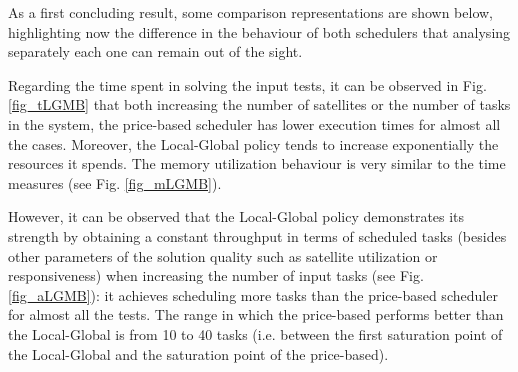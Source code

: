 As a first concluding result, some comparison representations are shown below, highlighting now the difference in the behaviour of both schedulers that analysing separately each one can remain out of the sight.

Regarding the time spent in solving the input tests, it can be observed in Fig. \ref{fig_tLGMB} that both increasing the number of satellites or the number of tasks in the system, the price-based scheduler has lower execution times for almost all the cases. Moreover, the Local-Global policy tends to increase exponentially the resources it spends. The memory utilization behaviour is very similar to the time measures (see Fig. \ref{fig_mLGMB}).

However, it can be observed that the Local-Global policy demonstrates its strength by obtaining a constant throughput in terms of scheduled tasks (besides other parameters of the solution quality such as satellite utilization or responsiveness) when increasing the number of input tasks (see Fig. \ref{fig_aLGMB}): it achieves scheduling more tasks than the price-based scheduler for almost all the tests. The range in which the price-based performs better than the Local-Global is from 10 to 40 tasks (i.e. between the first saturation point of the Local-Global and the saturation point of the price-based).

